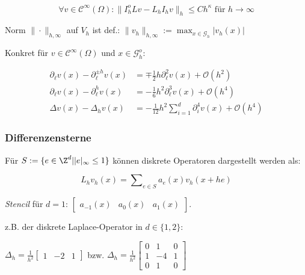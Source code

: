 \vspace*{-4mm}
\[ \forall v \in \mathcal{C}^\infty(\Omega) : \|I_h^o Lv - L_h I_h v\|_h \leq C h^\kappa \text{ für } h \to \infty \]

Norm $\|\cdot\|_{h,\infty}$ auf $V_h$ ist def.: $\|v_h\|_{h,\infty} := \displaystyle\max_{x \in \mathcal{G}_h} |v_h(x)|$

Konkret für $v \in \mathcal{C}^\infty(\Omega)$ und $x \in \mathcal{G}_h^o$:

\vspace*{-4mm}
\begin{align*}
\partial_\ell v(x) - \partial_\ell^{\pm h} v(x) &= \mp \frac{1}{2} h \partial_\ell^2 v(x) + \mathcal{O}(h^2) \\
\partial_\ell v(x) - \partial_\ell^h v(x) &= - \frac{1}{6} h^2 \partial_\ell^3 v(x) + \mathcal{O}(h^4) \\
\Delta v(x) - \Delta_h v(x) &= - \frac{1}{12} h^2 \textstyle\sum_{i=1}^d \partial_i^4 v(x) + \mathcal{O}(h^4)
\end{align*}

\subsubsection*{Differenzensterne}

Für $S := \{ e \in \Z^d | |e|_\infty \leq 1 \}$ können diskrete Operatoren dargestellt werden als:

\vspace*{-2mm}
\[ L_h v_h(x) = \displaystyle\sum\nolimits_{e \in S} a_e(x) v_h(x+he) \]

\emph{Stencil} für $d=1$: $\begin{bmatrix} a_{-1}(x) & a_0(x) & a_1(x) \end{bmatrix}$.

z.B. der diskrete Laplace-Operator in $d \in \{ 1, 2 \}$:

$\Delta_h = \frac{1}{h^2} \begin{bmatrix} 1 & -2 & 1 \end{bmatrix}$ bzw. $\Delta_h = \frac{1}{h^2} \begin{bmatrix} 0 & 1 & 0 \\ 1 & -4 & 1 \\ 0 & 1 & 0 \end{bmatrix}$
